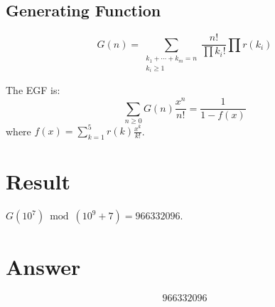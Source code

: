 \documentclass[12pt]{article}
\begin{document}
\subsection{Generating Function}
\[
G(n) = \sum_{\substack{k_1+\cdots+k_m=n \\ k_i \geq 1}} \frac{n!}{\prod k_i!} \prod r(k_i)
\]

The EGF is:
\[
\sum_{n \geq 0} G(n) \frac{x^n}{n!} = \frac{1}{1 - f(x)}
\]
where $f(x) = \sum_{k=1}^{5} r(k) \frac{x^k}{k!}$.

\section{Result}
$G(10^7) \bmod (10^9+7) = \boxed{966332096}$.

\section{Answer}

\[
\boxed{966332096}
\]
\end{document}
